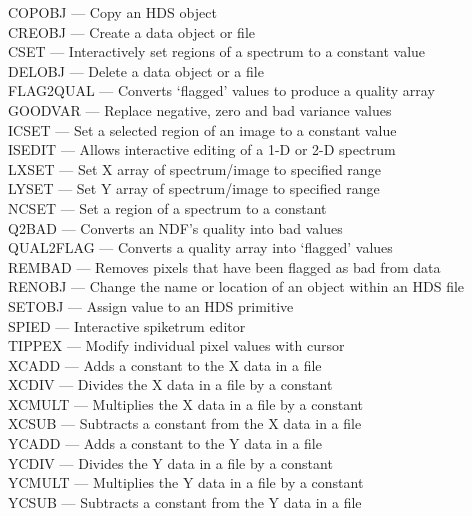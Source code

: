 \documentclass[11pt,twoside]{article}
\newcommand{\htmlref}[2]{#1}
\begin{document}
\htmlref{COPOBJ}{COPOBJ} --- Copy an HDS object\\
\htmlref{CREOBJ}{CREOBJ} --- Create a data object or file\\
\htmlref{CSET}{CSET} --- Interactively set regions of a spectrum to a constant value\\
\htmlref{DELOBJ}{DELOBJ} --- Delete a data object or a file\\
\htmlref{FLAG2QUAL}{FLAG2QUAL} --- Converts `flagged' values to produce a quality array\\
\htmlref{GOODVAR}{GOODVAR} --- Replace negative, zero and bad variance values\\
\htmlref{ICSET}{ICSET} --- Set a selected region of an image to a constant value\\
\htmlref{ISEDIT}{ISEDIT} --- Allows interactive editing of a 1-D or 2-D spectrum\\
\htmlref{LXSET}{LXSET} --- Set X array of spectrum/image to specified range\\
\htmlref{LYSET}{LYSET} --- Set Y array of spectrum/image to specified range\\
\htmlref{NCSET}{NCSET} --- Set a region of a spectrum to a constant\\
\htmlref{Q2BAD}{Q2BAD} --- Converts an NDF's quality into bad values\\
\htmlref{QUAL2FLAG}{QUAL2FLAG} --- Converts a quality array into `flagged' values\\
\htmlref{REMBAD}{REMBAD} --- Removes pixels that have been flagged as bad from data\\
\htmlref{RENOBJ}{RENOBJ} --- Change the name or location of an object within an HDS file\\
\htmlref{SETOBJ}{SETOBJ} --- Assign value to an HDS primitive\\
\htmlref{SPIED}{SPIED} --- Interactive spiketrum editor\\
\htmlref{TIPPEX}{TIPPEX} --- Modify individual pixel values with cursor\\
\htmlref{XCADD}{XCADD} --- Adds a constant to the X data in a file\\
\htmlref{XCDIV}{XCDIV} --- Divides the X data in a file by a constant\\
\htmlref{XCMULT}{XCMULT} --- Multiplies the X data in a file by a constant\\
\htmlref{XCSUB}{XCSUB} --- Subtracts a constant from the X data in a file\\
\htmlref{YCADD}{YCADD} --- Adds a constant to the Y data in a file\\
\htmlref{YCDIV}{YCDIV} --- Divides the Y data in a file by a constant\\
\htmlref{YCMULT}{YCMULT} --- Multiplies the Y data in a file by a constant\\
\htmlref{YCSUB}{YCSUB} --- Subtracts a constant from the Y data in a file
\end{document}

